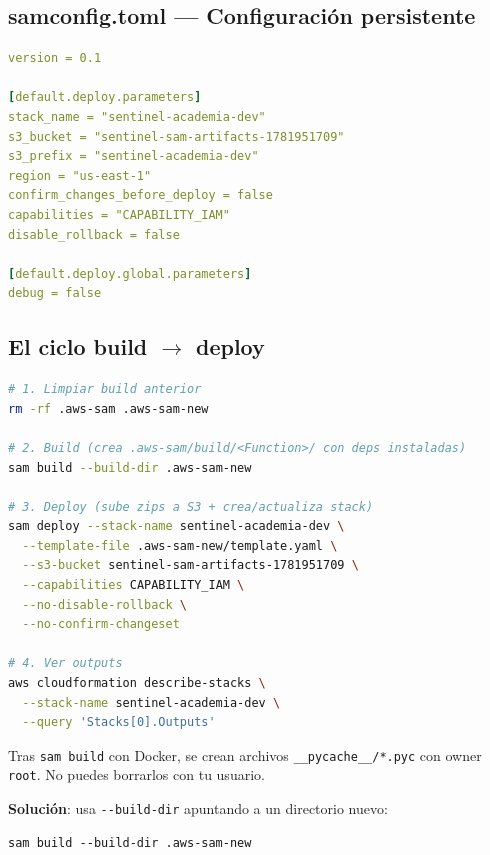 \documentclass[11pt,a4paper,oneside]{article}
\begin{document}
\subsection{samconfig.toml --- Configuraci\'on persistente}

\begin{lstlisting}[language=yaml,caption={infra/samconfig.toml}]
version = 0.1

[default.deploy.parameters]
stack_name = "sentinel-academia-dev"
s3_bucket = "sentinel-sam-artifacts-1781951709"
s3_prefix = "sentinel-academia-dev"
region = "us-east-1"
confirm_changes_before_deploy = false
capabilities = "CAPABILITY_IAM"
disable_rollback = false

[default.deploy.global.parameters]
debug = false
\end{lstlisting}

\subsection{El ciclo build $\rightarrow$ deploy}

\begin{lstlisting}[language=bash,caption={Comandos esenciales}]
# 1. Limpiar build anterior
rm -rf .aws-sam .aws-sam-new

# 2. Build (crea .aws-sam/build/<Function>/ con deps instaladas)
sam build --build-dir .aws-sam-new

# 3. Deploy (sube zips a S3 + crea/actualiza stack)
sam deploy --stack-name sentinel-academia-dev \
  --template-file .aws-sam-new/template.yaml \
  --s3-bucket sentinel-sam-artifacts-1781951709 \
  --capabilities CAPABILITY_IAM \
  --no-disable-rollback \
  --no-confirm-changeset

# 4. Ver outputs
aws cloudformation describe-stacks \
  --stack-name sentinel-academia-dev \
  --query 'Stacks[0].Outputs'
\end{lstlisting}

\begin{tcolorbox}[colback=errred!5!white,colframe=errred,title={Trampa \#3: \_\_pycache\_\_ con permisos de root}]
Tras \texttt{sam build} con Docker, se crean archivos \texttt{\_\_pycache\_\_/*.pyc} con owner \texttt{root}. No puedes borrarlos con tu usuario.

\textbf{Soluci\'on}: usa \texttt{-{}-build-dir} apuntando a un directorio nuevo:
\begin{lstlisting}
sam build --build-dir .aws-sam-new
\end{lstlisting}
\end{tcolorbox}
\end{document}
